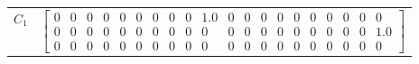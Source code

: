 \begin{tabular}{cl}
 $C_{1}$  & $\left[\begin{array}{cccccccccccccccccccc}0 & 0 & 0 & 0 & 0 & 0 & 0 & 0 & 0 & 1.0 & 0 & 0 & 0 & 0 & 0 & 0 & 0 & 0 & 0 & 0\\0 & 0 & 0 & 0 & 0 & 0 & 0 & 0 & 0 & 0 & 0 & 0 & 0 & 0 & 0 & 0 & 0 & 0 & 0 & 1.0\\0 & 0 & 0 & 0 & 0 & 0 & 0 & 0 & 0 & 0 & 0 & 0 & 0 & 0 & 0 & 0 & 0 & 0 & 0 & 0\end{array}\right]$                                                                                                                                                                                                                                                                                                                                                                                                                                                                                                                                                                                                                                                                                                                                                                                                                                                                                                                                                                                                                                                                                                                                                                                                                                                                                                                                                                                                                                                                                                                                                                                                                                                                                                                                                                                                                                                                                                                                                                                                                                                                                                                                                                                                                                                                                                                                                                                                                                                                                                                                                                                                                                                                                                                                                                                                                                                                                                            
\end{tabular}
